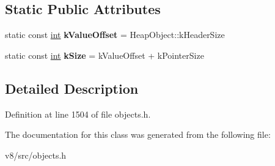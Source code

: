 \subsection*{Static Public Attributes}
\begin{DoxyCompactItemize}
\item 
\mbox{\label{classv8_1_1internal_1_1Cell_acfd85eb2807c5733f141824831db579a}} 
static const \mbox{\hyperlink{classint}{int}} {\bfseries k\+Value\+Offset} = Heap\+Object\+::k\+Header\+Size
\item 
\mbox{\label{classv8_1_1internal_1_1Cell_a89511edf4b516f88407a31344483d897}} 
static const \mbox{\hyperlink{classint}{int}} {\bfseries k\+Size} = k\+Value\+Offset + k\+Pointer\+Size
\end{DoxyCompactItemize}


\subsection{Detailed Description}


Definition at line 1504 of file objects.\+h.



The documentation for this class was generated from the following file\+:\begin{DoxyCompactItemize}
\item 
v8/src/objects.\+h\end{DoxyCompactItemize}
